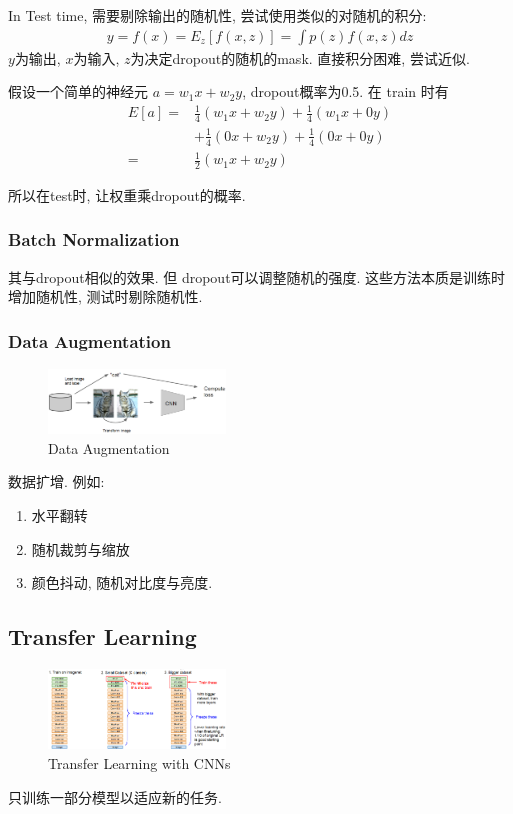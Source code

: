 In Test time, 需要剔除输出的随机性, 尝试使用类似的对随机的积分: 
\begin{align*}
    y=f(x)=E_z[f(x,z)]=\int p(z)f(x,z)dz
\end{align*}
$y$为输出, $x$为输入, $z$为决定dropout的随机的mask. 直接积分困难, 尝试近似. 

假设一个简单的神经元 $a=w_1 x+ w_2 y$, dropout概率为0.5. 在 train 时有
\begin{align*}
    E[a]=&\frac{1}{4}(w_1 x + w_2 y) + \frac{1}{4} (w_1x+0y)\\
        &+\frac{1}{4}(0x+w_2y)+\frac{1}{4}(0x+0y)\\
        =&\frac{1}{2}(w_1 x + w_2 y)
\end{align*}

所以在test时, 让权重乘dropout的概率. 

\subsubsection{Batch Normalization}
其与dropout相似的效果. 但 dropout可以调整随机的强度. 这些方法本质是训练时增加随机性, 测试时剔除随机性. 

\subsubsection{Data Augmentation}
\begin{figure}[!htb]
    \centering
    \includegraphics[width=0.42\textwidth]{pic/Lec7/Data Augmentation}
    \caption{Data Augmentation}
\end{figure}

数据扩增. 例如:
\begin{enumerate}
    \item 水平翻转
    \item 随机裁剪与缩放
    \item 颜色抖动, 随机对比度与亮度. 
\end{enumerate}

\subsection{Transfer Learning}

\begin{figure}[!htb]
    \centering
    \includegraphics[width=0.42\textwidth]{pic/Lec7/Transfer Learning with CNNs}
    \caption{Transfer Learning with CNNs}
\end{figure}

只训练一部分模型以适应新的任务. 
